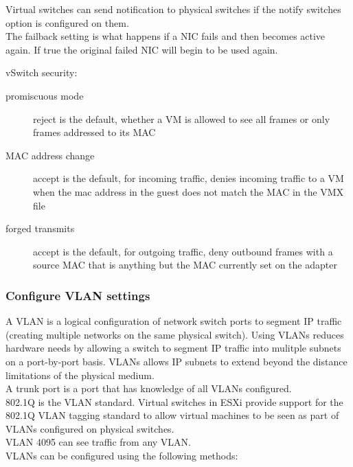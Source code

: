 Virtual switches can send notification to physical switches if the notify
switches option is configured on them.\\

The failback setting is what happens if a NIC fails and then becomes active
again. If true the original failed NIC will begin to be used again.

vSwitch security:

\begin{description}

\item[promiscuous mode]
reject is the default, whether a VM is allowed to see all frames or only
frames addressed to its MAC

\item[MAC address change]
accept is the default, for incoming traffic, denies incoming traffic to a VM
when the mac address in the guest does not match the MAC in the VMX file

\item[forged transmits]
accept is the default, for outgoing traffic, deny outbound frames with a
source MAC that is anything but the MAC currently set on the adapter

\end{description}

\subsubsection{Configure VLAN settings}

A VLAN is a logical configuration of network switch ports to segment IP
traffic (creating multiple networks on the same physical switch). Using VLANs
reduces hardware needs by allowing a switch to segment IP traffic into
mulitple subnets on a port-by-port basis. VLANs allows IP subnets to extend
beyond the distance limitations of the physical medium.\\

A trunk port is a port that has knowledge of all VLANs configured.\\

802.1Q is the VLAN standard. Virtual switches in ESXi provide support for the
802.1Q VLAN tagging standard to allow virtual machines to be seen as part of
VLANs configured on physical switches.\\

VLAN 4095 can see traffic from any VLAN.\\

VLANs can be configured using the following methods:

